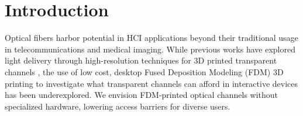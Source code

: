 \section{Introduction}

Optical fibers
harbor potential in HCI applications beyond their traditional usage in telecommunications and medical imaging.
While previous works have explored light delivery through high-resolution  techniques for 3D printed transparent channels \cite{printed_optics_2012, clr_printed_optical_fibers_2014},
the use of low cost, desktop Fused Deposition Modeling (FDM) 3D printing to investigate what transparent channels can afford in interactive devices has been underexplored.
We envision FDM-printed optical channels without specialized hardware, lowering access barriers for diverse users.


